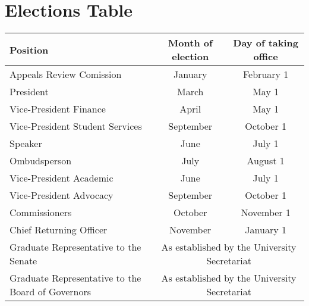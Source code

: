 \section{Elections Table}

\begin{center}
    \begin{tabular}{ l |c   c }

    Position & Month of election & Day of taking office \\  \hline
    Appeals Review Comission & January & February 1\\ 
    President & March & May 1\\
    Vice-President Finance  & April & May 1 \\ 
    Vice-President Student Services & September & October 1 \\ 
    Speaker & June & July 1 \\ 
    Ombudsperson & July & August 1\\
    Vice-President Academic & June & July 1 \\ 
    Vice-President Advocacy & September & October 1 \\ 
    Commissioners & October & November  1 \\ 
    Chief Returning Officer & November & January 1 \\ 
    Graduate Representative to the Senate &\multicolumn{2}{c}{As established by the University Secretariat}\\
	Graduate Representative to the Board of Governors  &\multicolumn{2}{c}{As established by the University Secretariat}\\	
\end{tabular}
\end{center}


\newpage
